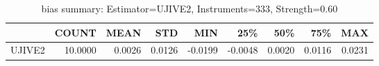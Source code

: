 \begin{table}[ht]
\centering
\caption{bias summary: Estimator=UJIVE2, Instruments=333, Strength=0.60}
\begin{tabular}{lrrrrrrrr}
\toprule
 & COUNT & MEAN & STD & MIN & 25\% & 50\% & 75\% & MAX \\
\midrule
UJIVE2 & 10.0000 & 0.0026 & 0.0126 & -0.0199 & -0.0048 & 0.0020 & 0.0116 & 0.0231 \\
\bottomrule
\end{tabular}
\end{table}
